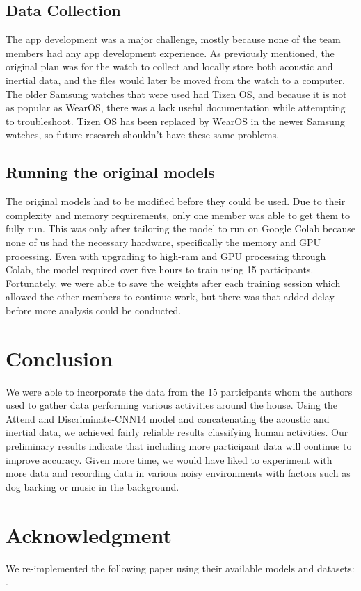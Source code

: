\documentclass[conference]{IEEEtran}
\begin{document}
	
	\subsection{Data Collection}
	The app development was a major challenge, mostly because none of the team members had any app development experience.
	As previously mentioned, the original plan was for the watch to collect and locally store both acoustic and inertial data, and the files would later be moved from the watch to a computer.
	The older Samsung watches that were used had Tizen OS, and because it is not as popular as WearOS, there was a lack useful documentation while attempting to troubleshoot.
	Tizen OS has been replaced by WearOS in the newer Samsung watches, so future research shouldn't have these same problems.
	
	\subsection{Running the original models}
	The original models had to be modified before they could be used. 
	Due to their complexity and memory requirements, only one member was able to get them to fully run. This was only after tailoring the model to run on Google Colab because none of us had the necessary hardware, specifically the memory and GPU processing. Even with upgrading to high-ram and GPU processing through Colab, the model required over five hours to train using 15 participants. Fortunately, we were able to save the weights after each training session which allowed the other members to continue work, but there was that added delay before more analysis could be conducted.
	
	\section{Conclusion}
	
	We were able to incorporate the data from the 15 participants whom the authors used to gather data performing various activities around the house. Using the Attend and Discriminate-CNN14 model and concatenating the acoustic and inertial data, we achieved fairly reliable results classifying human activities. Our preliminary results indicate that including more participant data will continue to improve accuracy. Given more time, we would have liked to experiment with more data and recording data in various noisy environments with factors such as dog barking or music in the background.
	
	
	\section*{Acknowledgment}
	We re-implemented the following paper using their available models and datasets: \cite{2022_Leveraging_sound}.
	
	\nocite{*}
	\printbibliography
	
\end{document}
